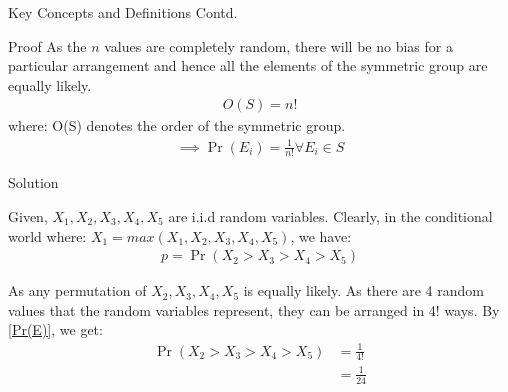 \documentclass{beamer}
\providecommand{\pr}[1]{\ensuremath{\Pr\left(#1\right)}}
\begin{document}
\begin{frame}{Key Concepts and Definitions Contd.}
\begin{block}{Proof}
As the $n$ values are completely random, there will be no bias for a particular arrangement and hence all the elements of the symmetric group are equally likely.
\begin{align}
    O(S) = n!
\end{align}
where: O(S) denotes the order of the symmetric group.
\begin{align}
\implies \pr{E_i} = \frac{1}{n!} \forall E_i \in S \label{Pr(E)}
\end{align}
\end{block}
\end{frame}
\begin{frame}{Solution}
\begin{block}{}
Given, $X_1,X_2,X_3,X_4,X_5$ are i.i.d random variables.
Clearly, in the conditional world where: $X_1 = max(X_1,X_2,X_3,X_4,X_5)$, we have:
\begin{align}
 p = \pr{X_2 > X_3 > X_4 > X_5}
\end{align}
\end{block}
\begin{block}{}
As any permutation of $X_2,X_3,X_4,X_5$ is equally likely.
As there are 4 random values that the random variables represent, they can be arranged in 4! ways. By \eqref{Pr(E)}, we get:
\begin{align}
   \pr{X_2>X_3>X_4>X_5} &= \frac{1}{4!}\\&= \frac{1}{24}
\end{align}
\end{block}
\end{frame}
\end{document}
